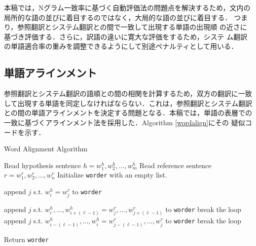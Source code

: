 \documentclass[japanese]{jnlp_1.4}
\begin{document}
本稿では，Nグラム一致率に基づく自動評価法の問題点を解決するため，文内の
局所的な語の並びに着目するのではなく，大局的な語の並びに着目する．
つまり，参照翻訳とシステム翻訳との間で一致して出現する単語の出現順
の近さに基づき評価する．さらに，訳語の違いに寛大な評価をするため，システ
ム翻訳の単語適合率の重みを調整できるようにして別途ペナルティとして用いる．


\subsection{単語アラインメント}


参照翻訳とシステム翻訳の語順との間の相関を計算するため，双方の翻訳に一致
して出現する単語を同定しなければならない．これは，参照翻訳とシステム翻訳
との間の単語アラインメントを決定する問題となる．本稿では，単語の表層での
一致に基づくアラインメント法を採用した．Algorithm \ref{wordalign}にその
疑似コードを示す．

\begin{algorithm}[b]
 \caption{Word Alignment Algorithm}
 \label{wordalign}
 \footnotesize
 \begin{algorithmic}[1]
  \STATE Read hypothesis sentence $h=w_1^h,w_2^h,\ldots,w_m^h$
  \STATE Read reference sentence $r=w_1^r,w_2^r,\ldots,w_n^r$
  \STATE Initialize {\tt worder} with an empty list.


  \STATE append $j$ s.t. $w_i^h=w_j^r$ to {\tt worder}
  \ELSIF


  \STATE append $j$ s.t. $w_i^h,\ldots,w_{i+(\ell-1)}^h=w_j^r,\ldots,w_{j+(\ell-1)}^r$ to {\tt worder}
  \STATE break the loop
  \ENDIF
  \ENDFOR
  \ELSE
  \STATE append $j$ s.t. $w_{i-(\ell-1)}^h,\ldots,w_i^h=w_{j-(\ell-1)}^r,\ldots,w_{j}^r$ to {\tt worder}
  \STATE break the loop
  \ENDIF

  \ENDFOR

  \ENDIF
  \ENDFOR
  \STATE Return {\tt worder}
 \end{algorithmic}
\end{algorithm}
\end{document}
